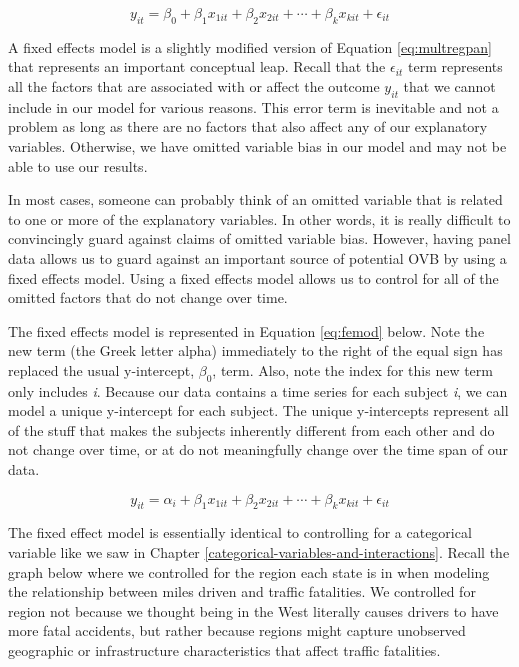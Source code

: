 \documentclass[
]{book}
\begin{document}
\begin{equation}
y_{it}=\beta_0+\beta_1x_{1it}+\beta_2x_{2it}+\cdots+\beta_kx_{kit}+\epsilon_{it}
\label{eq:multregpan}
\end{equation}

A fixed effects model is a slightly modified version of Equation \eqref{eq:multregpan} that represents an important conceptual leap. Recall that the \(\epsilon_{it}\) term represents all the factors that are associated with or affect the outcome \(y_{it}\) that we cannot include in our model for various reasons. This error term is inevitable and not a problem as long as there are no factors that also affect any of our explanatory variables. Otherwise, we have omitted variable bias in our model and may not be able to use our results.

In most cases, someone can probably think of an omitted variable that is related to one or more of the explanatory variables. In other words, it is really difficult to convincingly guard against claims of omitted variable bias. However, having panel data allows us to guard against an important source of potential OVB by using a fixed effects model. Using a fixed effects model allows us to control for all of the omitted factors that do not change over time.

The fixed effects model is represented in Equation \eqref{eq:femod} below. Note the new term (the Greek letter alpha) immediately to the right of the equal sign has replaced the usual y-intercept, \(\beta_0\), term. Also, note the index for this new term only includes \emph{i}. Because our data contains a time series for each subject \emph{i}, we can model a unique y-intercept for each subject. The unique y-intercepts represent all of the stuff that makes the subjects inherently different from each other and do not change over time, or at do not meaningfully change over the time span of our data.

\begin{equation}
y_{it}=\alpha_{i}+\beta_1x_{1it}+\beta_2x_{2it}+\cdots+\beta_kx_{kit}+\epsilon_{it}
\label{eq:femod}
\end{equation}

The fixed effect model is essentially identical to controlling for a categorical variable like we saw in Chapter \ref{categorical-variables-and-interactions}. Recall the graph below where we controlled for the region each state is in when modeling the relationship between miles driven and traffic fatalities. We controlled for region not because we thought being in the West literally causes drivers to have more fatal accidents, but rather because regions might capture unobserved geographic or infrastructure characteristics that affect traffic fatalities.
\end{document}
